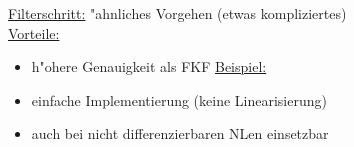 \documentclass[openany,a4paper,11pt]{book}
\begin{document}
\uline{Filterschritt:} "ahnliches Vorgehen (etwas kompliziertes)\\
\uline{Vorteile:}\begin{itemize}
    \item h"ohere Genauigkeit als FKF \uline{Beispiel:} 
    \item einfache Implementierung (keine Linearisierung)
    \item auch bei nicht differenzierbaren NLen einsetzbar
\end{itemize}
\end{document}
